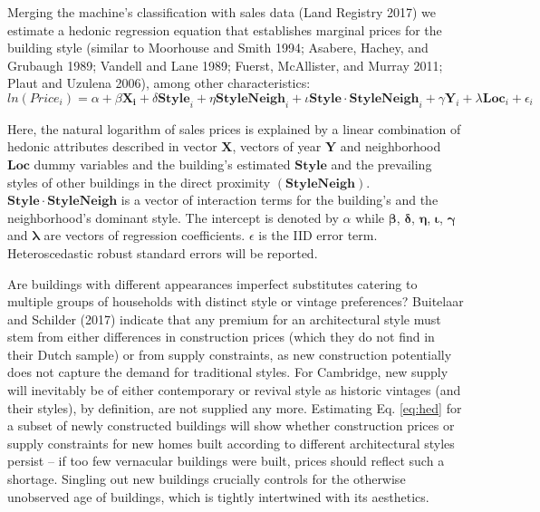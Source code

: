 \documentclass[]{article}
\begin{document}
Merging the machine's classification with sales data (Land Registry
2017) we estimate a hedonic regression equation that establishes
marginal prices for the building style (similar to Moorhouse and Smith
1994; Asabere, Hachey, and Grubaugh 1989; Vandell and Lane 1989; Fuerst,
McAllister, and Murray 2011; Plaut and Uzulena 2006), among other
characteristics: \begin{equation} \label{eq:hed}
  ln(Price_i) = \alpha + \beta\mathbf{X_i} + \delta\mathbf{Style}_i + \eta\mathbf{StyleNeigh}_i + \iota\mathbf{Style\cdot StyleNeigh}_i  +\gamma\mathbf{Y}_i + \lambda\mathbf{Loc}_i +  \epsilon_i
\end{equation}

Here, the natural logarithm of sales prices is explained by a linear
combination of hedonic attributes described in vector \(\mathbf{X}\),
vectors of year \(\mathbf{Y}\) and neighborhood \(\bm{Loc}\) dummy
variables and the building's estimated \(\mathbf{Style}\) and the
prevailing styles of other buildings in the direct proximity
\((\mathbf{StyleNeigh})\). \(\mathbf{Style\cdot StyleNeigh}\) is a
vector of interaction terms for the building's and the neighborhood's
dominant style. The intercept is denoted by \(\alpha\) while
\(\bm{\beta}\), \(\bm{\delta}\), \(\bm{\eta}\), \(\bm{\iota}\),
\(\bm{\gamma}\) and \(\bm{\lambda}\) are vectors of regression
coefficients. \(\epsilon\) is the IID error term. Heteroscedastic robust
standard errors will be reported.

Are buildings with different appearances imperfect substitutes catering
to multiple groups of households with distinct style or vintage
preferences? Buitelaar and Schilder (2017) indicate that any premium for
an architectural style must stem from either differences in construction
prices (which they do not find in their Dutch sample) or from supply
constraints, as new construction potentially does not capture the demand
for traditional styles. For Cambridge, new supply will inevitably be of
either contemporary or revival style as historic vintages (and their
styles), by definition, are not supplied any more. Estimating Eq.
\ref{eq:hed} for a subset of newly constructed buildings will show
whether construction prices or supply constraints for new homes built
according to different architectural styles persist -- if too few
vernacular buildings were built, prices should reflect such a shortage.
Singling out new buildings crucially controls for the otherwise
unobserved age of buildings, which is tightly intertwined with its
aesthetics.
\end{document}
